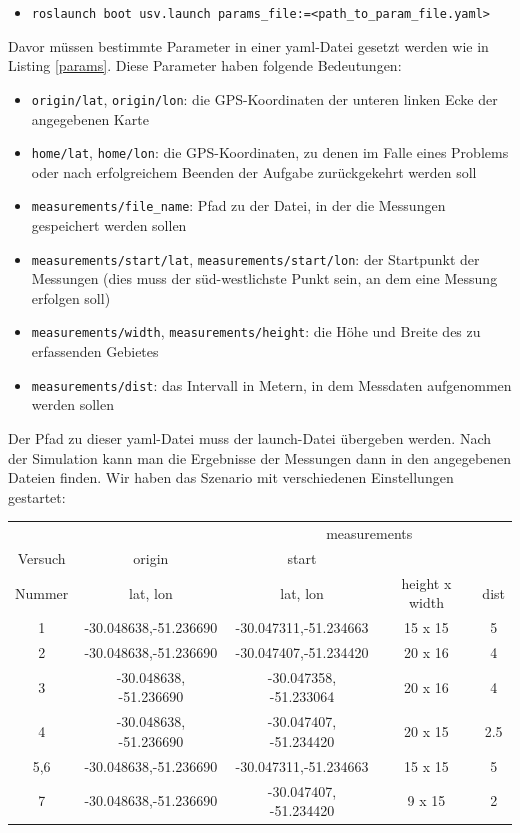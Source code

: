 \documentclass[11pt]{article}
\begin{document}
\begin{itemize} \label{launch}
	\item \texttt{roslaunch boot usv.launch params\_file:=<path\_to\_param\_file.yaml>}
\end{itemize}

%

Davor müssen bestimmte Parameter in einer yaml-Datei gesetzt werden wie in Listing \ref{params}. Diese Parameter haben folgende Bedeutungen:
\begin{itemize}
	\item \texttt{origin/lat}, \texttt{origin/lon}: die GPS-Koordinaten der unteren linken Ecke der angegebenen Karte
	\item \texttt{home/lat}, \texttt{home/lon}: die GPS-Koordinaten, zu denen im Falle eines Problems oder nach erfolgreichem Beenden der Aufgabe zurückgekehrt werden soll
	\item \texttt{measurements/file\_name}: Pfad zu der Datei, in der die Messungen gespeichert werden sollen
	\item \texttt{measurements/start/lat}, \texttt{measurements/start/lon}: der Startpunkt der Messungen (dies muss der süd-westlichste Punkt sein, an dem eine Messung erfolgen soll)
	\item \texttt{measurements/width}, \texttt{measurements/height}: die Höhe und Breite des zu erfassenden Gebietes
	\item \texttt{measurements/dist}: das Intervall in Metern, in dem Messdaten aufgenommen werden sollen
\end{itemize}
Der Pfad zu dieser yaml-Datei muss der launch-Datei übergeben werden. Nach der Simulation kann man die Ergebnisse der Messungen dann in den angegebenen Dateien finden.
Wir haben das Szenario mit verschiedenen Einstellungen gestartet:

\begin{center}
\begin{tabular}[t]{|c|c| c| c| c|}
	\hline
	& & \multicolumn{3}{c|}{measurements}\\
	Versuch&origin&start& & \\
	Nummer	&lat, lon 			& lat, lon 			& height x width & dist\\
	\hline
	1	&-30.048638,-51.236690		&-30.047311,-51.234663		&15 x 15	&5\\
	\hline
	2	&-30.048638,-51.236690 		& -30.047407,-51.234420 	&20 x 16	&4\\
	\hline
	3	& -30.048638, -51.236690	& -30.047358, -51.233064	& 20 x 16 	&4\\
	\hline
	4	& -30.048638, -51.236690	& -30.047407, -51.234420	& 20 x 15 	&2.5 \\
	\hline
	5,6	&-30.048638,-51.236690		&-30.047311,-51.234663		&15 x 15	&5\\
	\hline
	7	&-30.048638,-51.236690		& -30.047407, -51.234420	& 9 x 15	& 2\\
	\hline
\end{tabular}
\end{center}
\end{document}
